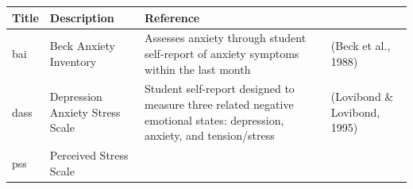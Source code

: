 \documentclass[]{book}
\begin{document}
\begin{longtable}[]{@{}llll@{}}
\toprule
\begin{minipage}[b]{0.22\columnwidth}\raggedright
Title\strut
\end{minipage} & \begin{minipage}[b]{0.27\columnwidth}\raggedright
Description\strut
\end{minipage} & \begin{minipage}[b]{0.22\columnwidth}\raggedright
Reference\strut
\end{minipage} & \begin{minipage}[b]{0.18\columnwidth}\raggedright
\strut
\end{minipage}\tabularnewline
\midrule
\endhead
\begin{minipage}[t]{0.22\columnwidth}\raggedright
bai\strut
\end{minipage} & \begin{minipage}[t]{0.27\columnwidth}\raggedright
Beck Anxiety Inventory\strut
\end{minipage} & \begin{minipage}[t]{0.22\columnwidth}\raggedright
Assesses anxiety through student self-report of anxiety symptoms within the last month\strut
\end{minipage} & \begin{minipage}[t]{0.18\columnwidth}\raggedright
(Beck et al., 1988)\strut
\end{minipage}\tabularnewline
\begin{minipage}[t]{0.22\columnwidth}\raggedright
dass\strut
\end{minipage} & \begin{minipage}[t]{0.27\columnwidth}\raggedright
Depression Anxiety Stress Scale\strut
\end{minipage} & \begin{minipage}[t]{0.22\columnwidth}\raggedright
Student self-report designed to measure three related negative emotional states: depression, anxiety, and tension/stress\strut
\end{minipage} & \begin{minipage}[t]{0.18\columnwidth}\raggedright
(Lovibond \& Lovibond, 1995)\strut
\end{minipage}\tabularnewline
\begin{minipage}[t]{0.22\columnwidth}\raggedright
pss\strut
\end{minipage} & \begin{minipage}[t]{0.27\columnwidth}\raggedright
Perceived Stress Scale\strut

\end{minipage}
\end{longtable}
\end{document}
